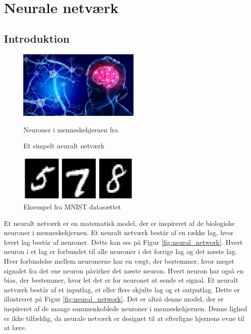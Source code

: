 \documentclass{article}
\newcommand{\figureref}[1]{Figur \ref{#1}}
\begin{document}
\section{Neurale netværk}
\subsection{Introduktion}
\begin{figure}
  \vspace{-0.5cm}
  \includegraphics[width=6cm]{neurons.jpg}
  \vspace{-0.8cm}
  \caption{Neuroner i menneskehjernen fra \parencite{St_Clair_2021}}
  \label{fig:neurons}
  \vspace{0.5cm}
  
  \vspace{-0.8cm}
  \caption{Et simpelt neuralt netværk}
  \label{fig:neural_network}
  \vspace{0.5cm}
  \includegraphics[width=6cm]{mnist1.jpg}
  \vspace{-0.8cm}
  \caption{Eksempel fra MNIST datasættet \parencite{LeCun_1994}}
  \label{fig:mnist}
\end{figure}
Et neuralt netværk er en matematisk model, der er inspireret af de biologiske neuroner i menneskehjernen. Et neuralt netværk består af en række lag, hvor hvert lag består af neuroner. Dette kan ses på \figureref{fig:neural_network}. Hvert neuron i et lag er forbundet til alle neuroner i det forrige lag og det næste lag. Hver forbindelse mellem neuronerne har en vægt, der bestemmer, hvor meget signalet fra det ene neuron påvirker det næste neuron. Hvert neuron har også en bias, der bestemmer, hvor let det er for neuronet at sende et signal. Et neuralt netværk består af et \color{red!90}inputlag\color{black}, et eller flere \color{violet!90}skjulte lag \color{black} og et \color{blue!90}outputlag\color{black}. Dette er illustreret på \figureref{fig:neural_network}. Det er altså denne model, der er inspireret af de mange sammenkoblede neuroner i menneskehjernen. Denne lighed er ikke tilfældig, da neurale netværk er designet til at efterligne hjernens evne til at lære.\\
\end{document}
